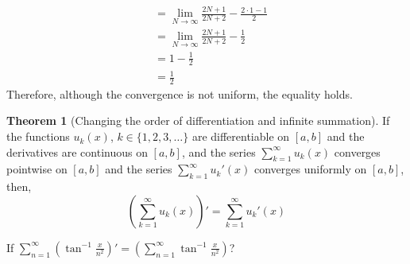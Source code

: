\documentclass[fleqn, a4paper, 12pt, twoside]{article}
\theoremstyle{definition}
\theoremstyle{theorem}
\newtheorem{theorem}{Theorem}
\begin{document}
\begin{solution}
\begin{align*}
                                                                                                                                     & = \lim\limits_{N \to \infty} \frac{2 N + 1}{2 N + 2} - \frac{2 \cdot 1 - 1}{2}                                                                                                         \\
                                                                                                                                     & = \lim\limits_{N \to \infty} \frac{2 N + 1}{2 N + 2} - \frac{1}{2}                                                                                                                     \\
                                                                                                                                     & = 1 - \frac{1}{2}                                                                                                                                                                      \\
                                                                                                                                     & = \frac{1}{2}
	\end{align*}
	Therefore, although the convergence is not uniform, the equality holds.
\end{solution}

\begin{theorem}[Changing the order of differentiation and infinite summation]
	If the functions $u_k(x)$, $k \in \{1, 2, 3, \dots\}$ are differentiable on $[a,b]$ and the derivatives are continuous on $[a,b]$, and the series $\sum\limits_{k = 1}^{\infty} u_k(x)$ converges pointwise on $[a,b]$ and the series $\sum\limits_{k = 1}^{\infty} {u_k}'(x)$ converges uniformly on $[a,b]$, then,
	\begin{equation*}
		\left( \sum\limits_{k = 1}^{\infty} u_k(x) \right)' = \sum\limits_{k = 1}^{\infty} {u_k}'(x)
	\end{equation*}
	\label{Changing_the_order_of_differentiation_and_infinite_summation}
\end{theorem}

\begin{question}
	If $\sum\limits_{n = 1}^{\infty} \left( \tan^{-1} \frac{x}{n^2} \right)' = \left( \sum\limits_{n = 1}^{\infty} \tan^{-1} \frac{x}{n^2} \right)$?
\end{question}
\end{document}
